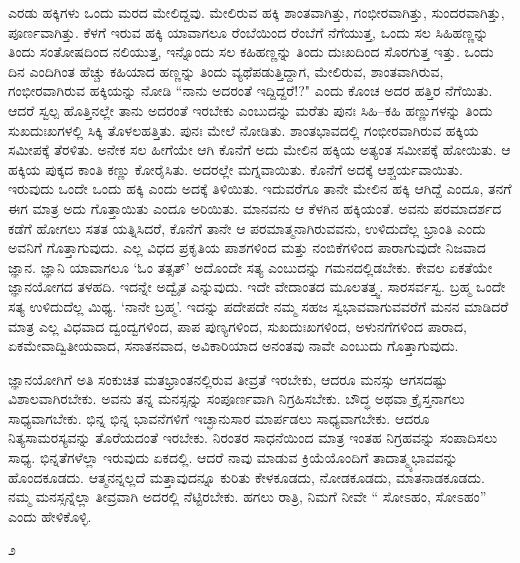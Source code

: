 ಎರಡು ಹಕ್ಕಿಗಳು ಒಂದು ಮರದ ಮೇಲಿದ್ದವು. ಮೇಲಿರುವ ಹಕ್ಕಿ ಶಾಂತವಾಗಿತ್ತು, ಗಂಭೀರವಾಗಿತ್ತು, ಸುಂದರವಾಗಿತ್ತು, ಪೂರ್ಣವಾಗಿತ್ತು. ಕೆಳಗೆ ಇರುವ ಹಕ್ಕಿ ಯಾವಾಗಲೂ ರೆಂಬೆಯಿಂದ ರೆಂಬೆಗೆ ನೆಗೆಯುತ್ತ, ಒಂದು ಸಲ ಸಿಹಿಹಣ್ಣನ್ನು ತಿಂದು ಸಂತೋಷದಿಂದ ನಲಿಯುತ್ತ, ಇನ್ನೊಂದು ಸಲ ಕಹಿಹಣ್ಣನ್ನು ತಿಂದು ದುಃಖದಿಂದ ಸೊರಗುತ್ತ ಇತ್ತು. ಒಂದು ದಿನ ಎಂದಿಗಿಂತ ಹೆಚ್ಚು ಕಹಿಯಾದ ಹಣ್ಣನ್ನು ತಿಂದು ವ್ಯಥೆಪಡುತ್ತಿದ್ದಾಗ, ಮೇಲಿರುವ, ಶಾಂತವಾಗಿರುವ, ಗಂಭೀರವಾಗಿರುವ ಹಕ್ಕಿಯನ್ನು ನೋಡಿ “ನಾನು ಅದರಂತೆ ಇದ್ದಿದ್ದರೆ!?" ಎಂದು ಕೊಂಚ ಅದರ ಹತ್ತಿರ ನೆಗೆಯಿತು. ಆದರೆ ಸ್ವಲ್ಪ ಹೊತ್ತಿನಲ್ಲೇ ತಾನು ಅದರಂತೆ ಇರಬೇಕು ಎಂಬುದನ್ನು ಮರೆತು ಪುನಃ ಸಿಹಿ–ಕಹಿ ಹಣ್ಣುಗಳನ್ನು ತಿಂದು ಸುಖದುಃಖಗಳಲ್ಲಿ ಸಿಕ್ಕಿ ತೊಳಲಹತ್ತಿತು. ಪುನಃ ಮೇಲೆ ನೋಡಿತು. ಶಾಂತಭಾವದಲ್ಲಿ ಗಂಭೀರವಾಗಿರುವ ಹಕ್ಕಿಯ ಸಮೀಪಕ್ಕೆ ತೆರಳಿತು. ಅನೇಕ ಸಲ ಹೀಗೆಯೇ ಆಗಿ ಕೊನೆಗೆ ಅದು ಮೇಲಿನ ಹಕ್ಕಿಯ ಅತ್ಯಂತ ಸಮೀಪಕ್ಕೆ ಹೋಯಿತು. ಆ ಹಕ್ಕಿಯ ಪುಕ್ಕದ ಕಾಂತಿ ಕಣ್ಣು ಕೋರೈಸಿತು. ಅದರಲ್ಲೇ ಮಗ್ನವಾಯಿತು. ಕೊನೆಗೆ ಅದಕ್ಕೆ ಆಶ್ಚರ್ಯವಾಯಿತು. ಇರುವುದು ಒಂದೇ ಒಂದು ಹಕ್ಕಿ ಎಂದು ಅದಕ್ಕೆ ತಿಳಿಯಿತು. ಇದುವರೆಗೂ ತಾನೇ ಮೇಲಿನ ಹಕ್ಕಿ ಆಗಿದ್ದೆ ಎಂದೂ, ತನಗೆ ಈಗ ಮಾತ್ರ ಅದು ಗೊತ್ತಾಯಿತು ಎಂದೂ ಅರಿಯಿತು. ಮಾನವನು ಆ ಕೆಳಗಿನ ಹಕ್ಕಿಯಂತೆ. ಅವನು ಪರಮಾದರ್ಶದ ಕಡೆಗೆ ಹೋಗಲು ಸತತ ಯತ್ನಿಸಿದರೆ, ಕೊನೆಗೆ ತಾನೇ ಆ ಪರಮಾತ್ಮನಾಗಿರುವವನು, ಉಳಿದುದೆಲ್ಲ ಭ್ರಾಂತಿ ಎಂದು ಅವನಿಗೆ ಗೊತ್ತಾಗುವುದು. ಎಲ್ಲ ವಿಧದ ಪ್ರಕೃತಿಯ ಪಾಶಗಳಿಂದ ಮತ್ತು ನಂಬಿಕೆಗಳಿಂದ ಪಾರಾಗುವುದೇ ನಿಜವಾದ ಜ್ಞಾನ. ಜ್ಞಾನಿ ಯಾವಾಗಲೂ `ಓಂ ತತ್ಸತ್' ಅದೊಂದೇ ಸತ್ಯ ಎಂಬುದನ್ನು ಗಮನದಲ್ಲಿಡಬೇಕು. ಕೇವಲ ಏಕತೆಯೇ ಜ್ಞಾನಯೋಗದ ತಳಹದಿ. ಇದನ್ನೇ ಅದ್ವೈತ ಎನ್ನುವುದು. ಇದೇ ವೇದಾಂತದ ಮೂಲತತ್ತ್ವ. ಸಾರಸರ್ವಸ್ವ. ಬ್ರಹ್ಮ ಒಂದೇ ಸತ್ಯ ಉಳಿದುದೆಲ್ಲ ಮಿಥ್ಯ. `ನಾನೇ ಬ್ರಹ್ಮ'. ಇದನ್ನು ಪದೇಪದೇ ನಮ್ಮ ಸಹಜ ಸ್ವಭಾವವಾಗುವವರೆಗೆ ಮನನ ಮಾಡಿದರೆ ಮಾತ್ರ ಎಲ್ಲ ವಿಧವಾದ ದ್ವಂದ್ವಗಳಿಂದ, ಪಾಪ ಪುಣ್ಯಗಳಿಂದ, ಸುಖದುಃಖಗಳಿಂದ, ಅಳುನಗೆಗಳಿಂದ ಪಾರಾದ, ಏಕಮೇವಾದ್ವಿತೀಯವಾದ, ಸನಾತನವಾದ, ಅವಿಕಾರಿಯಾದ ಅನಂತವು ನಾವೇ ಎಂಬುದು ಗೊತ್ತಾಗುವುದು.

ಜ್ಞಾನಯೋಗಿಗೆ ಅತಿ ಸಂಕುಚಿತ ಮತಭ್ರಾಂತನಲ್ಲಿರುವ ತೀವ್ರತೆ ಇರಬೇಕು, ಆದರೂ ಮನಸ್ಸು ಆಗಸದಷ್ಟು ವಿಶಾಲವಾಗಿರಬೇಕು. ಅವನು ತನ್ನ ಮನಸ್ಸನ್ನು ಸಂಪೂರ್ಣವಾಗಿ ನಿಗ್ರಹಿಸಬೇಕು. ಬೌದ್ಧ ಅಥವಾ ಕ್ರೈಸ್ತನಾಗಲು ಸಾಧ್ಯವಾಗಬೇಕು. ಭಿನ್ನ ಭಿನ್ನ ಭಾವನೆಗಳಿಗೆ ಇಚ್ಛಾನುಸಾರ ಮಾರ್ಪಡಲು ಸಾಧ್ಯವಾಗಬೇಕು. ಆದರೂ ನಿತ್ಯಸಾಮರಸ್ಯವನ್ನು ತೊರೆಯದಂತೆ ಇರಬೇಕು. ನಿರಂತರ ಸಾಧನೆಯಿಂದ ಮಾತ್ರ ಇಂತಹ ನಿಗ್ರಹವನ್ನು ಸಂಪಾದಿಸಲು ಸಾಧ್ಯ. ಭಿನ್ನತೆಗಳೆಲ್ಲಾ ಇರುವುದು ಏಕದಲ್ಲಿ. ಆದರೆ ನಾವು ಮಾಡುವ ಕ್ರಿಯೆಯೊಂದಿಗೆ ತಾದಾತ್ಮ್ಯಭಾವವನ್ನು ಹೊಂದಕೂಡದು. ಆತ್ಮನನ್ನಲ್ಲದೆ ಮತ್ತಾವುದನ್ನೂ ಕುರಿತು ಕೇಳಕೂಡದು, ನೋಡಕೂಡದು, ಮಾತನಾಡಕೂಡದು. ನಮ್ಮ ಮನಸ್ಸನ್ನೆಲ್ಲಾ ತೀವ್ರವಾಗಿ ಅದರಲ್ಲಿ ನೆಟ್ಟಿರಬೇಕು. ಹಗಲು ರಾತ್ರಿ, ನಿಮಗೆ ನೀವೇ `` ಸೋಽಹಂ, ಸೋಽಹಂ'' ಎಂದು ಹೇಳಿಕೊಳ್ಳಿ.

\begin{center}
೨
\end{center}

